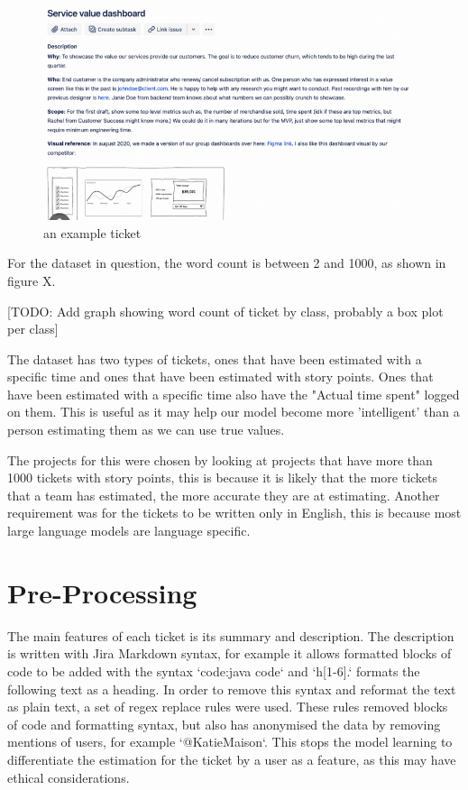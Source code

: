 \documentclass{UoYCSproject}
\begin{document}
    \begin{figure}[h]
        \includegraphics[width=\textwidth]{./figures/ticket-example}
        \caption{an example ticket}
        \label{fig:figure}
    \end{figure}

    For the dataset in question, the word count is between 2 and 1000, as shown in figure X.

    [TODO: Add graph showing word count of ticket by class, probably a box plot per class]

    The dataset has two types of tickets, ones that have been estimated with a specific time and ones that have been estimated with story points.
    Ones that have been estimated with a specific time also have the "Actual time spent" logged on them.
    This is useful as it may help our model become more 'intelligent' than a person estimating them as we can use true values. \par

    The projects for this were chosen by looking at projects that have more than 1000 tickets with story points, this is because it is likely that the more tickets that a team has estimated, the more accurate they are at estimating.
    Another requirement was for the tickets to be written only in English, this is because most large language models are language specific.


    \section{Pre-Processing}\label{sec:preprocessing}

    The main features of each ticket is its summary and description.
    The description is written with Jira Markdown syntax, for example it allows formatted blocks of code to be added with the syntax `{code:java} {code}` and `h[1-6].` formats the following text as a heading.
    In order to remove this syntax and reformat the text as plain text, a set of regex replace rules were used.
    These rules removed blocks of code and formatting syntax, but also has anonymised the data by removing mentions of users, for example `@KatieMaison`.
    This stops the model learning to differentiate the estimation for the ticket by a user as a feature, as this may have ethical considerations. \par
\end{document}
